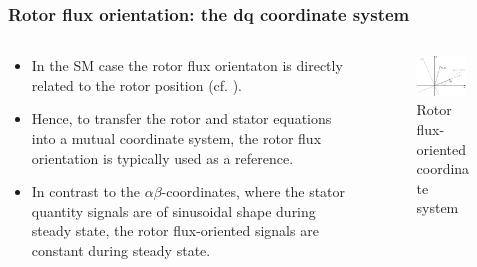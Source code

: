 \begin{frame}
	\frametitle{Rotor flux orientation: the dq coordinate system}	
    \begin{columns}
		\begin{column}{0.5\textwidth}
			\begin{itemize}
				\item In the SM case the rotor flux orientaton is directly related to the rotor position (cf. ). 
				\item Hence, to transfer the rotor and stator equations into a mutual coordinate system, the rotor flux orientation is typically used as a reference. 
				\item In contrast to the $\alpha\beta$-coordinates, where the stator quantity signals are of sinusoidal shape during steady state, the rotor flux-oriented signals are constant during steady state.
			\end{itemize}
		\end{column}
        \begin{column}{0.5\textwidth}
            \begin{figure}
                \centering
                \includegraphics[width=0.9\textwidth]{fig/lec07/dq_orientation.pdf}
                \caption{Rotor flux-oriented coordinate system}
                \label{fig:dq_orientation}
            \end{figure}
        \end{column}
    \end{columns}
\end{frame}

